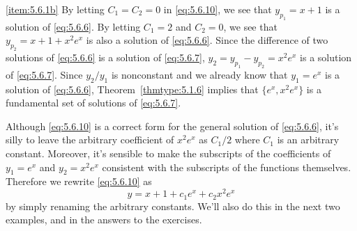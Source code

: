 \documentclass{ximera}
\begin{document}
\begin{example}
\begin{explanation}
\ref{item:5.6.1b} By letting $C_1=C_2=0$ in \eqref{eq:5.6.10}, we see that
$y_{p_1}=x+1$ is a solution of \eqref{eq:5.6.6}. By letting $C_1=2$ and
$C_2=0$, we see that $y_{p_2}=x+1+x^2e^x$ is also a solution of
\eqref{eq:5.6.6}. Since the difference of two solutions of \eqref{eq:5.6.6} is
a solution of \eqref{eq:5.6.7},
$y_2=y_{p_1}-y_{p_2}=x^2e^x$ is a solution of \eqref{eq:5.6.7}. Since
$y_2/y_1$ is nonconstant and we already know  that $y_1=e^x$ is a
solution of \eqref{eq:5.6.6}, Theorem~\ref{thmtype:5.1.6} implies that
$\{e^x,x^2e^x\}$ is a fundamental set of solutions of
\eqref{eq:5.6.7}.
\end{explanation}
\end{example}

Although \eqref{eq:5.6.10} is a correct form for the general solution of
\eqref{eq:5.6.6}, it's silly to leave the arbitrary coefficient of
$x^2e^x$ as $C_1/2$ where $C_1$ is an arbitrary constant. Moreover, it's
sensible to make the subscripts of the coefficients of $y_1=e^x$ and
$y_2=x^2e^x$ consistent with the subscripts of the functions
themselves. Therefore we rewrite \eqref{eq:5.6.10} as $$
y=x+1+c_1e^x+c_2x^2e^x $$ by simply renaming the arbitrary constants.
We'll also do this in the next two examples, and in the answers to
the exercises.
\end{document}
